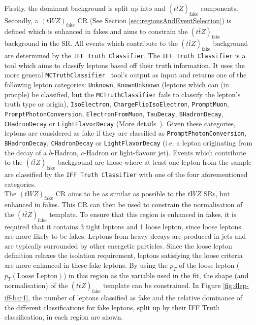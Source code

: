 Firstly, the dominant \ttZ background is split up into \ttZ and $(t\bar{t}Z)_{\text{fake}}$ components. Secondly, a $(tWZ)_{\text{fake}}$ CR (See Section \ref{sec:regionsAndEventSelection}) is defined which is enhanced in fakes and aims to constrain the $(t\bar{t}Z)_{\text{fake}}$ background in the SR. All events which contribute to the $(t\bar{t}Z)_{\text{fake}}$ background are determined by the \texttt{IFF Truth Classifier}. The \texttt{IFF Truth Classifier} is a tool which aims to classify leptons based off their truth information. It uses the more general \texttt{MCTruthClassifier}~\cite{MCTruthClassifier} tool's output as input and returns one of the following lepton categories: \texttt{Unknown}, \texttt{KnownUnknown} (leptons which can (in priciple) be classified, but the \texttt{MCTruthClassifier} fails to classify the lepton's truth type or origin), \texttt{IsoElectron}, \texttt{ChargeFlipIsoElectron}, \texttt{PromptMuon}, \texttt{PromptPhotonConversion}, \texttt{ElectronFromMuon}, \texttt{TauDecay}, \texttt{BHadronDecay}, \texttt{CHadronDecay} or \texttt{LightFlavorDecay} (More details~\cite{IFFTruthClassifier}). Given these categories, leptons are considered as fake if they are classified as \texttt{PromptPhotonConversion}, \texttt{BHadronDecay}, \texttt{CHadronDecay} or \texttt{LightFlavorDecay} (i.e. a lepton originating from the decay of a $b$-Hadron, $c$-Hadron or light-flavour jet). Events which contribute to the $(t\bar{t}Z)_{\text{fake}}$ background are those where at least one lepton from the \ttZ sample are classified by the \texttt{IFF Truth Classifier} with one of the four aforementioned categories.\\

The $(tWZ)_{\text{fake}}$ CR aims to be as similar as possible to the $tWZ$ SRs, but enhanced in fakes. This CR can then be used to constrain the normalisation of the $(t\bar{t}Z)_{\text{fake}}$ template. To ensure that this region is enhanced in fakes, it is required that it contains 3 tight leptons and 1 loose lepton, since loose leptons are more likely to be fakes. Leptons from heavy decays are produced in jets and are typically surrounded by other energetic particles. Since the loose lepton definition relaxes the isolation requirement, leptons satisfying the loose criteria are more enhanced in these fake leptons. By using the $p_{T}$ of the loose lepton ($p_{T}(\text{Loose Lepton})$) in this region as the variable used in the fit, the shape (and normalisation) of the $(t\bar{t}Z)_{\text{fake}}$ template can be constrained. In Figure \ref{fig:4lep-iff-bar1}, the number of leptons classified as fake and the relative dominance of the different classifications for fake leptons, split up by their IFF Truth classification, in each region are shown.

